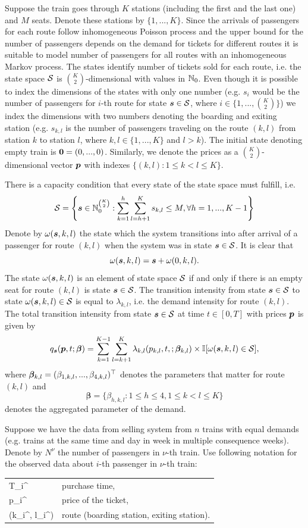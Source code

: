 Suppose the train goes through $K$ stations (including the first and the last one) and $M$ seats. Denote these stations by $\{1, ..., K\}$. Since the arrivals of passengers for each route follow inhomogeneous Poisson process and the upper bound for the number of passengers depends on the demand for tickets for different routes it is suitable to model number of passengers for all routes with an inhomogeneous Markov process. The states identify number of tickets sold for each route, i.e. the state space $\S$ is $\binom{K}{2}$-dimensional with values in $\N_0$. Even though it is possible to index the dimensions of the states with only one number (e.g. $s_i$ would be the number of passengers for $i$-th route for state $\m{s} \in \S$, where $i \in \{1, ..., \binom{K}{2} \}$) we index the dimensions with two numbers denoting the boarding and exiting station (e.g. $s_{k,l}$ is the number of passengers traveling on the route $(k,l)$ from station $k$ to station $l$, where $k,l \in \{1, ..., K\}$ and $l > k$). The initial state denoting empty train is $\m{0} = (0, ..., 0)$. Similarly, we denote the prices as a $\binom{K}{2}$-dimensional vector $\m{p}$ with indexes $\{ (k,l): 1 \leq k < l \leq K \}$.

There is a capacity condition that every state of the state space must fulfill, i.e.
\[
	\S = \left\{ \s \in \N_0^{\binom{K}{2}}: \sum_{k=1}^h \sum_{l=h+1}^K s_{k,l} \leq M, \forall h = 1, ..., K-1 \right\}
\]
Denote by $\omega (\s, k, l)$ the state which the system transitions into after arrival of a passenger for route $(k,l)$ when the system was in state $\s \in \S$. It is clear that
\[
	\omega (\s, k, l) = \s + \omega (\0, k, l).
\]
The state $\omega (\s, k, l)$ is an element of state space $\S$ if and only if there is an empty seat for route $(k,l)$ is state $\s \in \S$. The transition intensity from state $\s \in \S$ to state $\omega (\s, k, l) \in \S$ is equal to $\lambda_{k,l}$, i.e. the demand intensity for route $(k,l)$. The total transition intensity from state $\s \in \S$ at time $t \in [0,T]$ with prices $\m{p}$ is given by
\[
	q_{\s} (\m{p}, t; \m{\beta}) = \sum_{k=1}^{K-1} \sum_{l=k+1}^K \lambda_{k,l} (p_{k,l}, t, ; \m{\beta}_{k,l}) \times \mathbb{I} [ \omega (\s, k, l) \in \S ],
\]
where $\m{\beta}_{k,l} = (\beta_{1,k,l}, ..., \beta_{4,k,l})^{\top}$ denotes the parameters that matter for route $(k,l)$ and
\[
	\bm{\beta} = \{ \beta_{h,k,l}: 1 \leq h \leq 4, 1 \leq k < l \leq K \}
\]
denotes the aggregated parameter of the demand.

Suppose we have the data from selling system from $n$ trains with equal demands (e.g. trains at the same time and day in week in multiple consequence weeks). Denote by $N^{\nu}$ the number of passengers in $\nu$-th train. Use following notation for the observed data about $i$-th passenger in $\nu$-th train:
\begin{center}
	\begin{tabular}{ll}
		T_i^\nu & purchase time, \\
		p_i^\nu & price of the ticket, \\
		(k_i^\nu, l_i^\nu) & route (boarding station, exiting station).
	\end{tabular}
\end{center}

